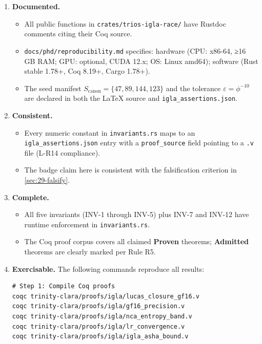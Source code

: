 \begin{enumerate}
  \item \textbf{Documented.}
        \begin{itemize}
          \item All public functions in \texttt{crates/trios-igla-race/}
                have Rustdoc comments citing their Coq source.
          \item \texttt{docs/phd/reproducibility.md} specifies:
                hardware (CPU: x86-64, ≥16 GB RAM; GPU: optional,
                CUDA 12.x; OS: Linux amd64); software (Rust stable
                1.78+, Coq 8.19+, Cargo 1.78+).
          \item The seed manifest $S_{\mathrm{canon}} = \{47, 89, 144,
                123\}$ and the tolerance $\varepsilon = \phi^{-10}$ are
                declared in both the LaTeX source and
                \texttt{igla\_assertions.json}.
        \end{itemize}
  \item \textbf{Consistent.}
        \begin{itemize}
          \item Every numeric constant in \texttt{invariants.rs} maps
                to an \texttt{igla\_assertions.json} entry with a
                \texttt{proof\_source} field pointing to a \texttt{.v}
                file (L-R14 compliance).
          \item The badge claim here is consistent with the falsification
                criterion in \textsection\ref{sec:29-falsify}.
        \end{itemize}
  \item \textbf{Complete.}
        \begin{itemize}
          \item All five invariants (INV-1 through INV-5) plus INV-7
                and INV-12 have runtime enforcement in
                \texttt{invariants.rs}.
          \item The Coq proof corpus covers all claimed
                \textbf{Proven} theorems; \textbf{Admitted} theorems
                are clearly marked per Rule R5.
        \end{itemize}
  \item \textbf{Exercisable.}
        The following commands reproduce all results:
        \begin{verbatim}
# Step 1: Compile Coq proofs
coqc trinity-clara/proofs/igla/lucas_closure_gf16.v
coqc trinity-clara/proofs/igla/gf16_precision.v
coqc trinity-clara/proofs/igla/nca_entropy_band.v
coqc trinity-clara/proofs/igla/lr_convergence.v
coqc trinity-clara/proofs/igla/igla_asha_bound.v


\end{verbatim}
\end{enumerate}

